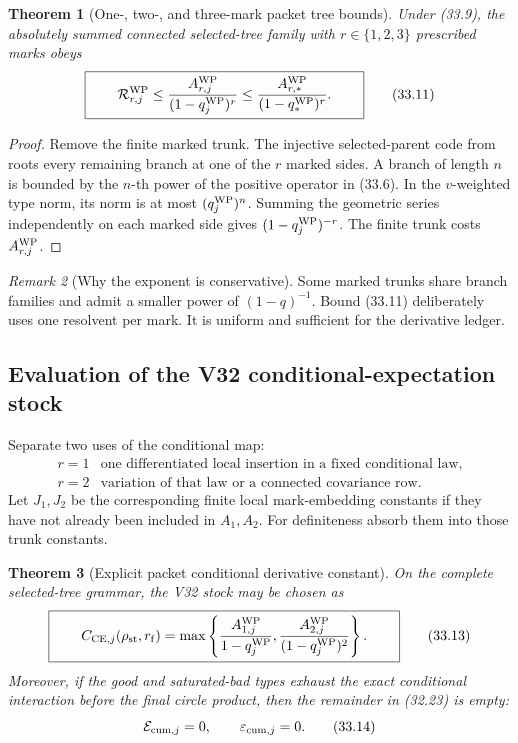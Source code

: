 \documentclass[11pt,oneside]{book}
\newtheorem{theorem}{Theorem}[chapter]
\theoremstyle{definition}
\theoremstyle{remark}
\newtheorem{remark}[theorem]{Remark}
\begin{document}
\begin{theorem}[One-, two-, and three-mark packet tree bounds]
\label{thm:e8v33-marked-resolvent}
Under (33.9), the absolutely summed connected selected-tree family
with \(r\in\{1,2,3\}\) prescribed marks obeys
\[
\boxed{\qquad
 {\cal R}_{r,j}^{\rm WP}
 \leq
 \frac{A_{r,j}^{\rm WP}}{(1-q_j^{\rm WP})^r}
 \leq
 \frac{A_{r,*}^{\rm WP}}{(1-q_*^{\rm WP})^r}.
\qquad}                                                         \tag{33.11}
\]
\end{theorem}

\begin{proof}
Remove the finite marked trunk.  The injective selected-parent code
from  roots every remaining branch at one of
the \(r\) marked sides.  A branch of length \(n\) is bounded by the
\(n\)-th power of the positive operator in (33.6).  In the
\(v\)-weighted type norm, its norm is at most
\((q_j^{\rm WP})^n\).  Summing the geometric series independently
on each marked side gives \((1-q_j^{\rm WP})^{-r}\).
The finite trunk costs \(A_{r,j}^{\rm WP}\).
\end{proof}

\begin{remark}[Why the exponent is conservative]
\label{rem:e8v33-mark-exponent}
Some marked trunks share branch families and admit a smaller power
of \((1-q)^{-1}\).  Bound (33.11) deliberately uses one resolvent
per mark.  It is uniform and sufficient for the derivative ledger.
\end{remark}

\subsection{Evaluation of the V32 conditional-expectation stock}

Separate two uses of the conditional map:
\[
\begin{array}{c|l}
r=1&\text{one differentiated local insertion in a fixed
conditional law},\\
r=2&\text{variation of that law or a connected covariance row}.
\end{array}                                                       \tag{33.12}
\]
Let \(J_1,J_2\) be the corresponding finite local mark-embedding
constants if they have not already been included in \(A_1,A_2\).
For definiteness absorb them into those trunk constants.

\begin{theorem}[Explicit packet conditional derivative constant]
\label{thm:e8v33-CE}
On the complete selected-tree grammar, the V32 stock may be chosen as
\[
\boxed{\qquad
 C_{{\rm CE},j}(\rho_{\rm st},r_{\rm f})
 =
 \max\left\{
 \frac{A_{1,j}^{\rm WP}}{1-q_j^{\rm WP}},
 \frac{A_{2,j}^{\rm WP}}{(1-q_j^{\rm WP})^2}
 \right\}.
\qquad}                                                         \tag{33.13}
\]
Moreover, if the good and saturated-bad types exhaust the exact
conditional interaction before the final circle product, then the
remainder in (32.23) is empty:
\[
                 {\cal E}_{{\rm cum},j}=0,\qquad
                 \varepsilon_{{\rm cum},j}=0.                   \tag{33.14}
\]
\end{theorem}
\end{document}
